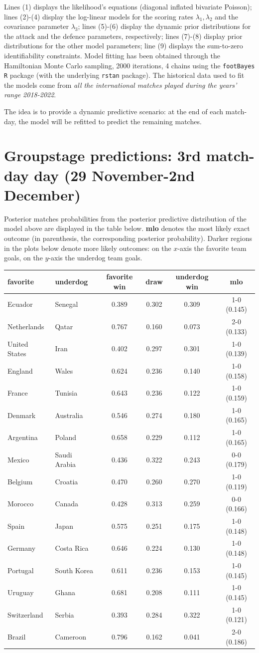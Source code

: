 \documentclass[
  10pt,
]{article}
\begin{document}
Lines (1) displays the likelihood's equations (diagonal inflated
bivariate Poisson); lines (2)-(4) display the log-linear models for the
scoring rates \(\lambda_{1}, \lambda_{2}\) and the covariance parameter
\(\lambda_3\); lines (5)-(6) display the dynamic prior distributions for
the attack and the defence parameters, respectively; lines (7)-(8)
display prior distributions for the other model parameters; line (9)
displays the sum-to-zero identifiability constraints. Model fitting has
been obtained through the Hamiltonian Monte Carlo sampling, 2000
iterations, 4 chains using the \texttt{footBayes} \texttt{R} package
(with the underlying \texttt{rstan} package). The historical data used
to fit the models come from \emph{all the international matches played
during the years' range 2018-2022}.

The idea is to provide a dynamic predictive scenario: at the end of each
match-day, the model will be refitted to predict the remaining matches.

\hypertarget{groupstage-predictions-3rd-match-day-day-28-november-1st-december}{%
\section{Groupstage predictions: 3rd match-day day (29 November-2nd
December)}\label{groupstage-predictions-3rd-match-day-day-29-november-2nd-december}}

Posterior matches probabilities from the posterior predictive
distribution of the model above are displayed in the table below.
\textbf{mlo} denotes the most likely exact outcome (in parenthesis, the
corresponding posterior probability). Darker regions in the plots below
denote more likely outcomes: on the \(x\)-axis the favorite team goals, on the
\(y\)-axis the underdog team goals.

\begin{longtable}[]{@{}llcccc@{}}
\toprule
favorite & underdog & favorite win & draw & underdog win & mlo\tabularnewline
\midrule
\endhead
Ecuador & Senegal & 0.389 & 0.302 & 0.309 & 1-0 (0.145)\tabularnewline
Netherlands & Qatar & 0.767 & 0.160 & 0.073 & 2-0 (0.133)\tabularnewline
United States  & Iran & 0.402  & 0.297 & 0.301  & 1-0
(0.139)\tabularnewline
 England & Wales & 0.624  & 0.236 &0.140  & 1-0 (0.158)\tabularnewline
 France & Tunisia &0.643  & 0.236 &0.122  & 1-0 (0.159)\tabularnewline
Denmark  &Australia  &0.546   & 0.274 & 0.180 & 1-0 (0.165)\tabularnewline
Argentina & Poland &0.658  & 0.229 & 0.112 & 1-0 (0.165)\tabularnewline
Mexico  &Saudi Arabia  &0.436  & 0.322 &0.243  & 0-0
(0.179)\tabularnewline
Belgium  &Croatia  & 0.470  & 0.260 &0.270  & 1-0 (0.119)\tabularnewline
Morocco  &Canada  &0.428  & 0.313 & 0.259  & 0-0 (0.166)\tabularnewline
 Spain  & Japan &0.575  & 0.251 & 0.175  & 1-0 (0.148)\tabularnewline
Germany  & Costa Rica  &0.646  & 0.224 & 0.130  & 1-0
(0.148)\tabularnewline
Portugal  &South Korea  &0.611  & 0.236 & 0.153  & 1-0
(0.145)\tabularnewline
Uruguay   &Ghana &0.681  & 0.208 & 0.111  & 1-0 (0.145)\tabularnewline
Switzerland   & Serbia &0.393  & 0.284 &0.322  & 1-0
(0.121)\tabularnewline
Brazil  &Cameroon  &0.796  & 0.162 & 0.041  & 2-0 (0.186)\tabularnewline
\bottomrule
\end{longtable}
\end{document}

